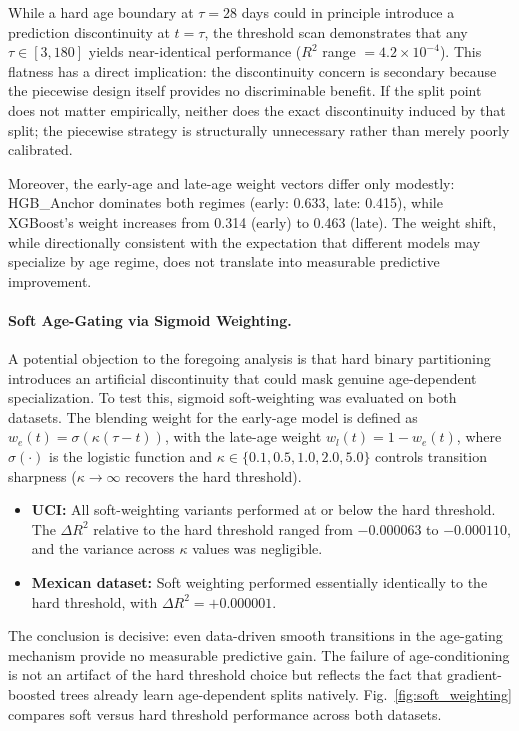 \documentclass[journal]{IEEEtran}
\begin{document}
While a hard age boundary at $\tau = 28$ days could in principle introduce a prediction discontinuity at $t=\tau$, the threshold scan demonstrates that any $\tau \in [3,180]$ yields near-identical performance ($R^2$ range $=4.2 \times 10^{-4}$). This flatness has a direct implication: the discontinuity concern is secondary because the piecewise design itself provides no discriminable benefit. If the split point does not matter empirically, neither does the exact discontinuity induced by that split; the piecewise strategy is structurally unnecessary rather than merely poorly calibrated.

Moreover, the early-age and late-age weight vectors differ only modestly: HGB\_Anchor dominates both regimes (early: 0.633, late: 0.415), while XGBoost's weight increases from 0.314 (early) to 0.463 (late). The weight shift, while directionally consistent with the expectation that different models may specialize by age regime, does not translate into measurable predictive improvement.

\paragraph{Soft Age-Gating via Sigmoid Weighting.} A potential objection to the foregoing analysis is that hard binary partitioning introduces an artificial discontinuity that could mask genuine age-dependent specialization. To test this, sigmoid soft-weighting was evaluated on both datasets. The blending weight for the early-age model is defined as $w_e(t) = \sigma(\kappa(\tau - t))$, with the late-age weight $w_l(t) = 1 - w_e(t)$, where $\sigma(\cdot)$ is the logistic function and $\kappa \in \{0.1, 0.5, 1.0, 2.0, 5.0\}$ controls transition sharpness ($\kappa \to \infty$ recovers the hard threshold).

\begin{itemize}
\item \textbf{UCI:} All soft-weighting variants performed at or below the hard threshold. The $\Delta R^2$ relative to the hard threshold ranged from $-0.000063$ to $-0.000110$, and the variance across $\kappa$ values was negligible.
\item \textbf{Mexican dataset:} Soft weighting performed essentially identically to the hard threshold, with $\Delta R^2 = +0.000001$.
\end{itemize}

The conclusion is decisive: even data-driven smooth transitions in the age-gating mechanism provide no measurable predictive gain. The failure of age-conditioning is not an artifact of the hard threshold choice but reflects the fact that gradient-boosted trees already learn age-dependent splits natively. Fig.~\ref{fig:soft_weighting} compares soft versus hard threshold performance across both datasets.
\end{document}
